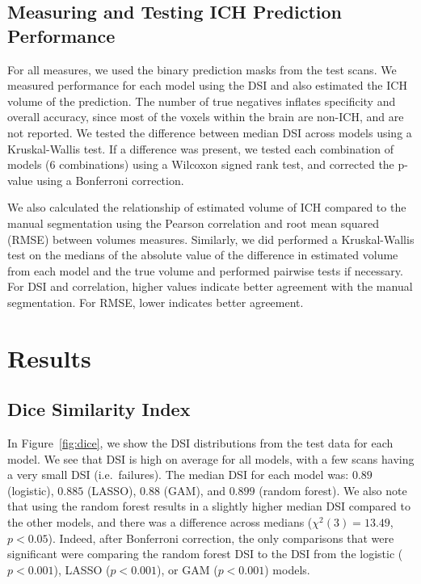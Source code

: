 \documentclass{elsarticle_nonatbib}\usepackage[]{graphicx}\usepackage[]{color}
\begin{document}
\subsection{Measuring and Testing ICH Prediction Performance}





For all measures, we used the binary prediction masks from the test scans.  We measured performance for each model using the DSI and also estimated the ICH volume of the prediction. The number of true negatives inflates specificity and overall accuracy, since most of the voxels within the brain are non-ICH, and are not reported.  We tested the difference between median DSI across models using a Kruskal-Wallis test.  If a difference was present, we tested each combination of models ($6$ combinations) using a Wilcoxon signed rank test, and corrected the p-value using a Bonferroni correction.


We also calculated the relationship of estimated volume of ICH compared to the manual segmentation using the Pearson correlation and root mean squared (RMSE) between volumes measures.  Similarly, we did performed a Kruskal-Wallis test on the medians of the absolute value of the difference in estimated volume from each model and the true volume and performed pairwise tests if necessary.  For DSI and correlation, higher values indicate better agreement with the manual segmentation.  For RMSE, lower indicates better agreement.


\section{Results}

\subsection{Dice Similarity Index}
In Figure~\ref{fig:dice}, we show the DSI distributions from the test data for each model.  We see that DSI is high on average for all models, with a few scans having a very small DSI (i.e.~failures).   The median DSI for each model was: $0.89$ (logistic), $0.885$  (LASSO), $0.88$ (GAM), and $0.899$ (random forest). 
We also note that using the random forest results in a slightly higher median DSI compared to the other models, and there was a difference across medians ($\chi^{2}(3)=13.49$, $p < 0.05$).  Indeed, after Bonferroni correction, the only comparisons that were significant were comparing the random forest DSI to the DSI from the logistic ($p < 0.001$), LASSO ($p < 0.001$), or GAM ($p < 0.001$) models.
\end{document}
